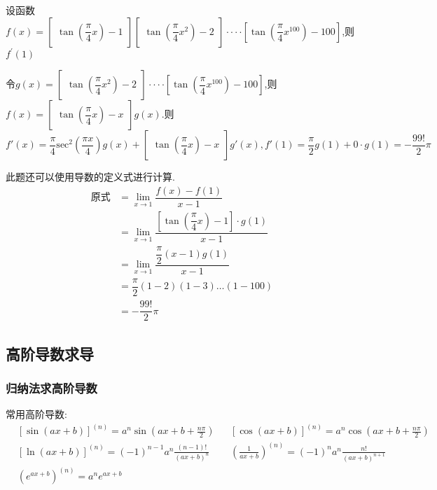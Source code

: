 \documentclass[8pt a4paper, oneside, UTF8]{ctexbook}  %
\begin{document}
\begin{sloppypar}
\begin{note}
    \end{note}
    \begin{problem}
        设函数 $f(x)=\begin{bmatrix}\tan\left(\dfrac{\pi}{4}x\right)-1\end{bmatrix}\begin{bmatrix}\tan\left(\dfrac{\pi}{4}x^{2}\right)-2\end{bmatrix}\cdotp\cdotp\cdotp\cdotp\left[\tan\left(\dfrac{\pi}{4}x^{100}\right)-100\right]$,则 $f^\prime(1)$
    \end{problem}
    \begin{solution}
        令$g(x)=\begin{bmatrix}\tan\left(\dfrac{\pi}{4}x^{2}\right)-2\end{bmatrix}\cdotp\cdotp\cdotp\cdotp\left[\tan\left(\dfrac{\pi}{4}x^{100}\right)-100\right]$,则$f(x)=\begin{bmatrix}\tan(\dfrac{\pi}{4}x)-x\end{bmatrix}g(x)$.则 $f'(x)=\dfrac\pi4\mathrm{sec}^2\left(\dfrac{\pi x}4\right)g(x)+\begin{bmatrix}\tan(\dfrac{\pi}{4}x)-x\end{bmatrix}g'(x),f'(1)=\dfrac{\pi}{2}g(1) + 0 \cdot g(1) = -\dfrac{99!}{2}\pi$
    \end{solution}
    \begin{note}
        此题还可以使用导数的定义式进行计算.
        \begin{align*}
          \text{原式} & = \lim_{x\to1}\dfrac{f(x)-f(1)}{x-1}\\
          & = \lim_{x\to1}\dfrac{[\tan(\dfrac{\pi}{4}x)-1]\cdot g(1)}{x-1}\\
          & = \lim_{x \to 1}\dfrac{\dfrac{\pi}{2}(x-1)g(1)}{x-1}\\
          & = \dfrac{\pi}{2}(1-2)(1-3)\dots(1-100)\\
          & = -\dfrac{99!}{2}\pi
        \end{align*}
    \end{note}
    \subsection{高阶导数求导}
    \subsubsection{归纳法求高阶导数}
    常用高阶导数:
    $$
    \begin{aligned}
        &\left[\sin(ax+b)\right]^{(n)}=a^{n}\sin\left(ax+b+\frac{n\pi}{2}\right)&  &\left[\cos(ax+b)\right]^{(n)}=a^{n}\cos\left(ax+b+\frac{n\pi}{2}\right)  \\
        &\left[\ln(ax+b)\right]^{(n)}=(-1)^{n-1}a^{n}\frac{(n-1)!}{(ax+b)^{n}}  &  &\left(\frac{1}{ax+b}\right)^{(n)}=(-1)^{n}a^{n}\frac{n!}{(ax+b)^{n+1}}   \\
        & \left(e^{ax+b}\right)^{(n)}=a^{n}e^{ax+b}&  & 
       \end{aligned}
    $$

\end{sloppypar}
\end{document}
